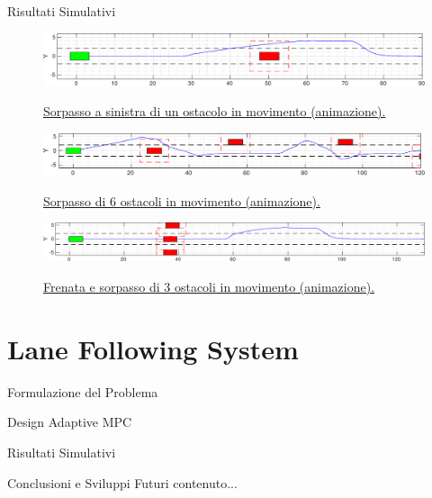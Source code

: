 \documentclass{beamer}
\begin{document}
	\begin{frame}{Risultati Simulativi}
		\begin{figure}								
		\href{run:./video/animation_one_obstacle_left_overtaking.avi}{\includegraphics[width=\textwidth]{./images/one_obstacle_right_overtaking/overtaking_pres.pdf}}
		\caption{\href{run:./video/animation_one_obstacle_left_overtaking.avi}{Sorpasso a sinistra di un ostacolo in movimento (animazione).}}
		\label{fig:un_ostacolo}
		\vspace{-1.5em}
		\end{figure}
		\begin{figure}
		\href{run:./video/animation_6_obstacles.avi}{\includegraphics[width=\textwidth]{./images/6_obstacles/6_obstacles_pres.pdf}}
		\caption{\href{run:./video/animation_6_obstacles.avi}{Sorpasso di 6 ostacoli in movimento (animazione).}}
		\label{fig:sei_ostacoli}
		\vspace{-1.5em}
		\end{figure}
		\begin{figure}
		\href{run:./video/animation_braking_overtaking.avi}{\includegraphics[width=\textwidth]{./images/three_obstacles_no_overtaking/braking_pres.pdf}}
		\caption{\href{./video/animation_braking_overtaking.avi}{Frenata e sorpasso di 3 ostacoli in movimento (animazione).}}
		\label{fig:frenata}
		\end{figure}
	\end{frame}
	
	\section{Lane Following System \qquad{}}  %
	
	\begin{frame}{Formulazione del Problema}

	\end{frame}
	
	\begin{frame}{Design Adaptive MPC} %
			
	\end{frame}
		
	\begin{frame}{Risultati Simulativi}
			
	\end{frame}
	\begin{frame}{Conclusioni e Sviluppi Futuri}
		contenuto...
	\end{frame}
\end{document}
